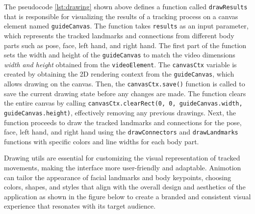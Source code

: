 The pseudocode \ref{lst:drawing} shown above defines a function called \texttt{drawResults} that is responsible for visualizing the results of a tracking process on a canvas element 
named \texttt{guideCanvas}. The function takes \texttt{results} as an input parameter, which represents the tracked landmarks and connections from different body parts such as 
pose, face, left hand, and right hand. The first part of the function sets the width and height of the \texttt{guideCanvas} to 
match the video dimensions \emph{width and height} obtained from the \texttt{videoElement}.
The \texttt{canvasCtx} variable is created by obtaining the 2D rendering context from the \texttt{guideCanvas}, which allows drawing on the canvas.
Then, the \texttt{canvasCtx.save()} function is called to save the current drawing state before any changes are made.
The function clears the entire canvas by calling \texttt{canvasCtx.clearRect(0, 0, guideCanvas.width, guideCanvas.height)}, effectively removing any previous drawings.
Next, the function proceeds to draw the tracked landmarks and connections for the pose, face, left hand, and right hand using the \texttt{drawConnectors} 
and \texttt{drawLandmarks} functions with specific colors and line widths for each body part.

Drawing utils are essential for customizing the visual representation of tracked movements, 
making the interface more user-friendly and adaptable. Animotion can tailor the appearance of facial landmarks and body keypoints, 
choosing colors, shapes, and styles that align with the overall design and aesthetics of the application as shown in the figure below %
to create a branded and consistent visual experience that resonates with its target audience.


